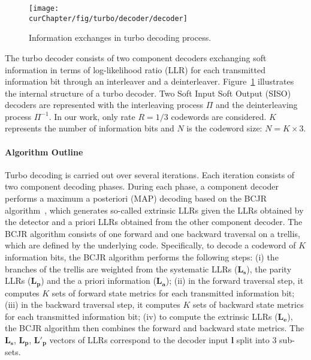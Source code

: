 \begin{figure}[htp]
  \centering
  \texttt{[image: \\curChapter/fig/turbo/decoder/decoder]}
  \caption{Information exchanges in turbo decoding process.}
  \label{fig:ctx_turbo_decoder}
\end{figure}

The turbo decoder consists of two component decoders exchanging soft information
in terms of log-likelihood ratio (LLR) for each transmitted information bit
through an interleaver and a deinterleaver. Figure~\ref{fig:ctx_turbo_decoder}
illustrates the internal structure of a turbo decoder. Two Soft Input Soft
Output (SISO) decoders are represented with the interleaving process $\Pi$ and
the deinterleaving process $\Pi^{-1}$. In our work, only rate $R = 1/3$
codewords are considered. $K$ represents the number of information bits and $N$
is the codeword size: $N = K \times 3$.

\paragraph{Algorithm Outline}

Turbo decoding is carried out over several iterations. Each iteration
consists of two component decoding phases. During each phase, a component
decoder performs a maximum a posteriori (MAP) decoding based on the BCJR
algorithm~\cite{Bahl1974}, which generates so-called extrinsic LLRs given the
LLRs obtained by the detector and a priori LLRs obtained from the other
component decoder. The BCJR algorithm consists of one forward and one backward
traversal on a trellis, which are defined by the underlying code. Specifically,
to decode a codeword of $K$ information bits, the BCJR algorithm performs the
following steps: (i) the branches of the trellis are weighted from the
systematic LLRs ($\bm{L_s}$), the parity LLRs ($\bm{L_p}$) and the a priori
information ($\bm{L_a}$); (ii) in the forward traversal step, it computes $K$
sets of forward state metrics for each transmitted information bit; (iii) in the
backward traversal step, it computes $K$ sets of backward state metrics for each
transmitted information bit; (iv) to compute the extrinsic LLRs ($\bm{L_e}$),
the BCJR algorithm then combines the forward and backward state metrics. The
$\bm{L_s}$, $\bm{L_p}$, $\bm{L'_p}$ vectors of LLRs correspond to the decoder
input $\bm{l}$ split into 3 sub-sets.

